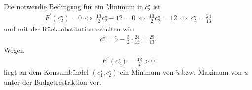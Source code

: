 Die notwendie Bedingung für ein Minimum in $c^\star_2$ ist
\begin{align*}
	F^\prime(c_2^\star) = 0 
	\ \Leftrightarrow \
	\frac{13}{2} c_2^\star - 12 = 0  
	\ \Leftrightarrow \
	\frac{13}{2} c_2^\star = 12 
	\ \Leftrightarrow \
	c_2^\star = \frac{24}{13}
\end{align*}
und mit der Rücksubstitution erhalten wir:
\begin{align*}
	c_1^\star = 5 - \frac{3}{2} \cdot \frac{24}{13}
	= \frac{29}{13}.
\end{align*}
Wegen 
\begin{align*}
	F^{\prime \prime}(c_2^\star ) = \frac{13}{2} > 0
\end{align*}
liegt an dem Konsumbündel $(c^\star_1,c^\star_2)$ ein Minimum von $\tilde{u}$ bzw. Maximum von $u$ unter der Budgetrestriktion vor.


\newpage

